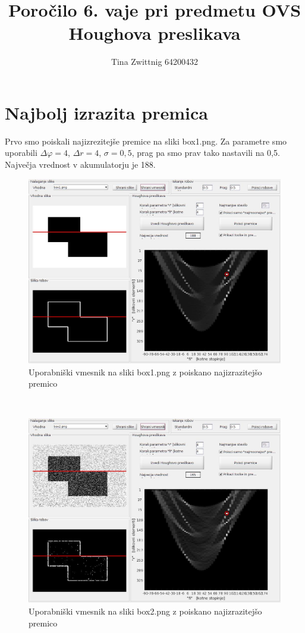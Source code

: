 \documentclass[12pt,a4paper]{article}
\author{Tina Zwittnig 64200432}
\title{Poročilo 6. vaje pri predmetu OVS \\ Houghova preslikava}
\begin{document}
\maketitle
\pagebreak
\section{Najbolj izrazita premica}
Prvo smo poiskali najizrezitejše premice na sliki box1.png. Za parametre smo uporabili $\Delta \varphi = 4$, $\Delta r = 4$, $\sigma =0,5$, prag pa smo prav tako nastavili na 0,5. Največja vrednost v akumulatorju je 188. \\
\begin{figure}[h!]
  \begin{center}
    \includegraphics[scale = 0.3]{slika_4_uporabniski_vmesnik.jpg}
    \caption{Uporabniški vmesnik na sliki box1.png z poiskano najizrazitejšo premico}
    \label{fig:}
  \end{center}
\end{figure}\\
\begin{figure}[h!]
  \begin{center}
    \includegraphics[scale = 0.3]{slika_4_uporabniski_vmesnikb.jpg}
    \caption{Uporabniški vmesnik na sliki box2.png z poiskano najizrazitejšo premico}
    \label{fig:}
  \end{center}
\end{figure}\\
\end{document}
